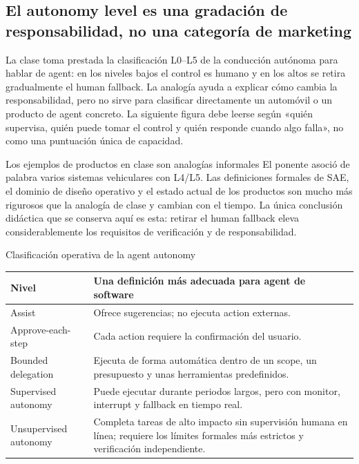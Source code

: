 \subsection{El autonomy level es una gradación de responsabilidad, no una categoría de marketing}

La clase toma prestada la clasificación L0--L5 de la conducción autónoma para hablar de agent: en los niveles bajos el control es humano y en los altos se retira gradualmente el human fallback. La analogía ayuda a explicar cómo cambia la responsabilidad, pero no sirve para clasificar directamente un automóvil o un producto de agent concreto. La siguiente figura debe leerse según «quién supervisa, quién puede tomar el control y quién responde cuando algo falla», no como una puntuación única de capacidad.


\begin{warningbox}{Los ejemplos de productos en clase son analogías informales}
El ponente asoció de palabra varios sistemas vehiculares con L4/L5. Las definiciones formales de SAE, el dominio de diseño operativo y el estado actual de los productos son mucho más rigurosos que la analogía de clase y cambian con el tiempo. La única conclusión didáctica que se conserva aquí es esta: retirar el human fallback eleva considerablemente los requisitos de verificación y de responsabilidad.
\end{warningbox}

\begin{knowledgebox}{Clasificación operativa de la agent autonomy}
\begin{tabularx}{\textwidth}{L{0.17\textwidth} X}
\toprule
Nivel & Una definición más adecuada para agent de software \\
\midrule
Assist & Ofrece sugerencias; no ejecuta action externas. \\
Approve-each-step & Cada action requiere la confirmación del usuario. \\
Bounded delegation & Ejecuta de forma automática dentro de un scope, un presupuesto y unas herramientas predefinidos. \\
Supervised autonomy & Puede ejecutar durante periodos largos, pero con monitor, interrupt y fallback en tiempo real. \\
Unsupervised autonomy & Completa tareas de alto impacto sin supervisión humana en línea; requiere los límites formales más estrictos y verificación independiente. \\
\bottomrule
\end{tabularx}
\end{knowledgebox}

